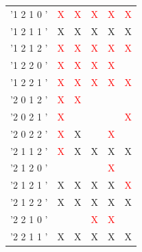 \documentclass[preprint,3p,times,twocolumn]{elsarticle}
\begin{document}
\begin{table}[ht]
\begin{center}
\begin{tabular}{|p{}|p{}|p{}|p{}|p{}|p{}|}
\rowcolor{yellow} '1 2 1 0 '     & \textcolor{red}{X}    & \textcolor{red}{X}    & \textcolor{red}{X} & \textcolor{red}{X} & \textcolor{red}{X}  \\
              	  '1 2 1 1 '     & X                     & X                     & X                  & X                  & X                   \\
              	  '1 2 1 2 '     & \textcolor{red}{X}    & \textcolor{red}{X}    & \textcolor{red}{X} & \textcolor{red}{X} & \textcolor{red}{X}  \\
              	  '1 2 2 0 '     & \textcolor{red}{X}    & \textcolor{red}{X}    & \textcolor{red}{X} & \textcolor{red}{X}  &                    \\
              	  '1 2 2 1 '     & \textcolor{red}{X}    & \textcolor{red}{X}    & \textcolor{red}{X} & \textcolor{red}{X} & \textcolor{red}{X}  \\
              	  '2 0 1 2 '     & \textcolor{red}{X}    & \textcolor{red}{X}    &                    &                    &                     \\
              	  '2 0 2 1 '     & \textcolor{red}{X}    &                       &                    &                    & \textcolor{red}{X}  \\
              	  '2 0 2 2 '     & \textcolor{red}{X}    & X                     &                    & \textcolor{red}{X} &                     \\
              	  '2 1 1 2 '     & \textcolor{red}{X}    & X                     & X                  & X                  & X                   \\
              	  '2 1 2 0 '     &                       &                       &                    & \textcolor{red}{X} &                     \\
              	  '2 1 2 1 '     & X                     & X                     & X                  & X                  & \textcolor{red}{X}  \\
              	  '2 1 2 2 '     & X                     & X                     & X                  & X                  & X                   \\
              	  '2 2 1 0 '     &                       &                       & \textcolor{red}{X} & \textcolor{red}{X} &                     \\
              	  '2 2 1 1 '     & X                     & X                     & X                  & X                  & X                   \\

\end{tabular}
\end{center}
\end{table}
\end{document}
